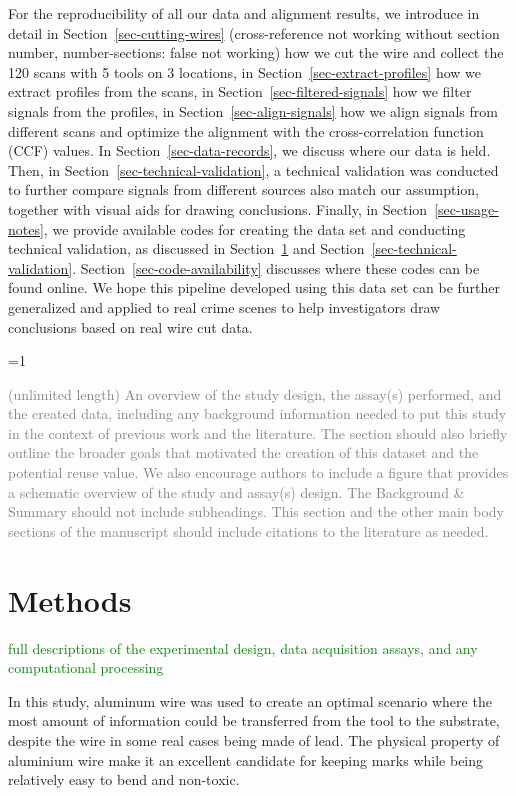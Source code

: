 \documentclass[fleqn,10pt]{wlscirep}
\newcommand{\tom}[1]{{\textcolor{RedOrange}{#1}}}
\newcommand{\hh}[1]{{\textcolor{Green}{#1}}}
\newcommand{\ifinstruction}{1} %
\begin{document}
For the reproducibility of all our data and alignment results, we
introduce in detail in Section~\ref{sec-cutting-wires}
\tom{(cross-reference not working without section number, number-sections: false not working)}
how we cut the wire and collect the 120 scans with 5 tools on 3
locations, in Section~\ref{sec-extract-profiles} how we extract profiles
from the scans, in Section~\ref{sec-filtered-signals} how we filter
signals from the profiles, in Section~\ref{sec-align-signals} how we
align signals from different scans and optimize the alignment with the
cross-correlation function (CCF) values. In
Section~\ref{sec-data-records}, we discuss where our data is held. Then,
in Section~\ref{sec-technical-validation}, a technical validation was
conducted to further compare signals from different sources also match
our assumption, together with visual aids for drawing conclusions.
Finally, in Section~\ref{sec-usage-notes}, we provide available codes
for creating the data set and conducting technical validation, as
discussed in Section~\ref{sec-methods} and
Section~\ref{sec-technical-validation}.
Section~\ref{sec-code-availability} discusses where these codes can be
found online. We hope this pipeline developed using this data set can be
further generalized and applied to real crime scenes to help
investigators draw conclusions based on real wire cut data.

\ifnum \ifinstruction=1

\textcolor{gray}{(unlimited length) An overview of the study design, the assay(s) performed, and the created data, including any background information needed to put this study in the context of previous work and the literature. The section should also briefly outline the broader goals that motivated the creation of this dataset and the potential reuse value. We also encourage authors to include a figure that provides a schematic overview of the study and assay(s) design. The Background \& Summary should not include subheadings. This section and the other main body sections of the manuscript should include citations to the literature as needed.}
\fi

\section{Methods}\label{sec-methods}

\hh{full descriptions of the experimental design, data acquisition assays, and any computational processing}

In this study, aluminum wire was used to create an optimal scenario
where the most amount of information could be transferred from the tool
to the substrate, despite the wire in some real cases being made of
lead. The physical property of aluminium wire make it an excellent
candidate for keeping marks while being relatively easy to bend and
non-toxic.
\end{document}
